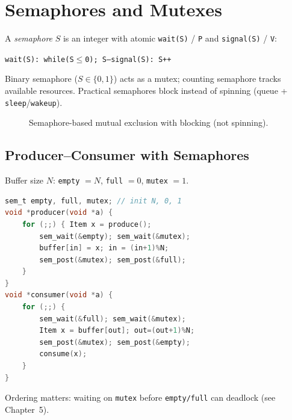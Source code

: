 \section{Semaphores and Mutexes}
\label{sec:semaphores}

A \emph{semaphore} $S$ is an integer with atomic \texttt{wait(S)} / \texttt{P}
and \texttt{signal(S)} / \texttt{V}:

\begin{center}
\texttt{wait(S): while(S$\le$0); S--\quad\quad signal(S): S++}
\end{center}
Binary semaphore ($S\in\{0,1\}$) acts as a mutex; counting semaphore tracks
available resources. Practical semaphores block instead of spinning (queue +
\texttt{sleep}/\texttt{wakeup}).

\begin{figure}[h!]
\centering
{}
\caption{Semaphore-based mutual exclusion with blocking (not spinning).}
\label{fig:semaphore}
\end{figure}

\subsection{Producer--Consumer with Semaphores}
Buffer size $N$: \texttt{empty} $=N$, \texttt{full} $=0$, \texttt{mutex} $=1$.
\begin{lstlisting}[language=C,caption={Bounded buffer --- semaphore solution}]
sem_t empty, full, mutex; // init N, 0, 1
void *producer(void *a) {
    for (;;) { Item x = produce();
        sem_wait(&empty); sem_wait(&mutex);
        buffer[in] = x; in = (in+1)%N;
        sem_post(&mutex); sem_post(&full);
    }
}
void *consumer(void *a) {
    for (;;) {
        sem_wait(&full); sem_wait(&mutex);
        Item x = buffer[out]; out=(out+1)%N;
        sem_post(&mutex); sem_post(&empty);
        consume(x);
    }
}
\end{lstlisting}
Ordering matters: waiting on \texttt{mutex} before \texttt{empty/full} can
deadlock (see Chapter~5).

